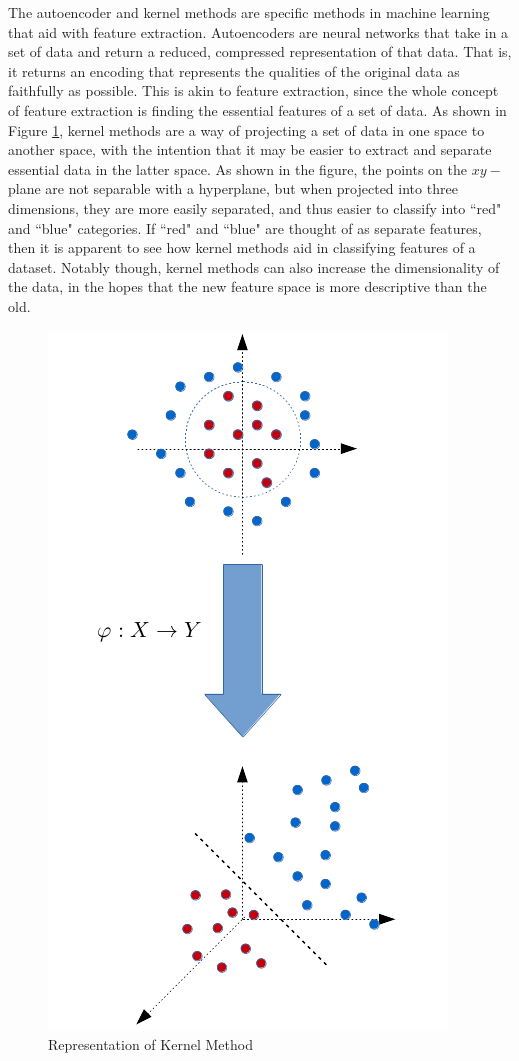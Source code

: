\documentclass{sig-alternate}
\begin{document}
The autoencoder and kernel methods are specific methods in machine learning that aid with feature
extraction. Autoencoders are neural networks that take in a set of data and return a reduced, 
compressed representation of that data. That is, it returns an encoding that represents the qualities of
the original data as faithfully as possible. This is akin to feature 
extraction, since the whole concept of feature extraction is finding the essential features 
of a set of data. As shown in Figure \ref{fig:kernelmeth}, kernel methods are a way of projecting
a set of data in one space to another space, with the intention that it may
be easier to extract and separate essential data in the latter space. As shown in the figure, the
points on the $xy-$plane are not separable with a hyperplane, but when projected into three 
dimensions, they are more easily separated, and thus easier to classify into ``red" and ``blue" 
categories. If ``red" and ``blue" are thought of as separate features, then it is apparent to see
how kernel methods aid in classifying features of a dataset. Notably though, kernel methods can
also increase the dimensionality of the data, in the hopes that the new feature space is more 
descriptive than the old. 

\begin{figure}[h]
	\begin{center}
		\includegraphics[width=0.75\linewidth]{kernelmeth}
	\end{center}
	\vspace{-12pt}
	\caption{Representation of Kernel Method}
	\label{fig:kernelmeth}
\end{figure}
\end{document}
